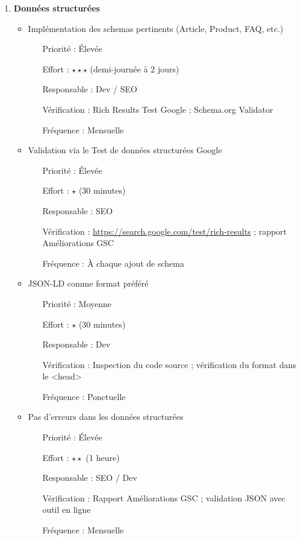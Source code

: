\documentclass[12pt,a4paper,twoside]{report}
\begin{document}
\begin{enumerate}
    \item \textbf{Données structurées}
    \begin{itemize}
        \item Implémentation des schemas pertinents (Article, Product, FAQ, etc.)
        \begin{itemize}
            \item[Priorité :] Élevée
            \item[Effort :] $\star\star\star$ (demi-journée à 2 jours)
            \item[Responsable :] Dev / SEO
            \item[Vérification :] Rich Results Test Google ; Schema.org Validator
            \item[Fréquence :] Mensuelle
        \end{itemize}
        \item Validation via le Test de données structurées Google
        \begin{itemize}
            \item[Priorité :] Élevée
            \item[Effort :] $\star$ (30 minutes)
            \item[Responsable :] SEO
            \item[Vérification :] \url{https://search.google.com/test/rich-results} ; rapport Améliorations GSC
            \item[Fréquence :] À chaque ajout de schema
        \end{itemize}
        \item JSON-LD comme format préféré
        \begin{itemize}
            \item[Priorité :] Moyenne
            \item[Effort :] $\star$ (30 minutes)
            \item[Responsable :] Dev
            \item[Vérification :] Inspection du code source ; vérification du format dans le <head>
            \item[Fréquence :] Ponctuelle
        \end{itemize}
        \item Pas d'erreurs dans les données structurées
        \begin{itemize}
            \item[Priorité :] Élevée
            \item[Effort :] $\star\star$ (1 heure)
            \item[Responsable :] SEO / Dev
            \item[Vérification :] Rapport Améliorations GSC ; validation JSON avec outil en ligne
            \item[Fréquence :] Mensuelle
        \end{itemize}
    \end{itemize}


\end{enumerate}
\end{document}
